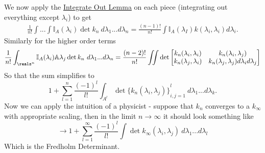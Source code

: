 We now apply the \hyperref[lemma:integrateout]{Integrate Out Lemma} on each piece (integrating out everything except $\lambda_i$) to get \begin{align*}
    \frac{1}{n!} \int...\int \mathbb{I}_A (\lambda_i) \det k_n \ d\lambda_1...d\lambda_n = \frac{(n-1)!}{n!} \int \mathbb{I}_A(\lambda_I)k(\lambda_i,\lambda_i) d\lambda_i.
\end{align*}
Similarly for the higher order terms \[
\frac{1}{n!} \int_{\reals^n} \mathbb{I}_A(\lambda_i) \mathbb{A}\lambda_j \det k_n \ d\lambda_1...d\lambda_n = \frac{(n-2)!}{n!} \iint \det \begin{bmatrix}
    k_n(\lambda_i,\lambda_i) &k_n(\lambda_i,\lambda_j) \\
    k_n(\lambda_j,\lambda_i) &k_n(\lambda_j,\lambda_j) d\lambda_i d\lambda_j 
\end{bmatrix}
\]
So that the sum simplifies to \[
1+\sum_{l=1}^{n}\frac{(-1)^l}{l!} \int_{A^l}
\det {\{k_n (\lambda_i,\lambda_j )\}}_{i,j=1}^{l} \ d\lambda_1...d\lambda_k.
\] 
Now we can apply the intuition of a physicist - suppose that $k_n$ converges to a $k_{\infty}$ with appropriate scaling, then in the limit $n\to \infty$ it should look something like \[
\to 1+\sum_{l=1}^{\infty}\frac{(-1)^l}{l!}\int \det k_{\infty}(\lambda_i,\lambda_j) \ d\lambda_1... d\lambda_l
\]
Which is the Fredholm Determinant. 
